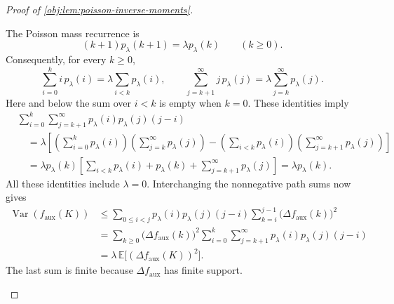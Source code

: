 \documentclass[11pt]{article}
\begin{document}
\begin{proof}[Proof of \cref{obj:lem:poisson-inverse-moments}]
\begin{enumerate}
The Poisson mass recurrence is
\[
(k+1)p_\lambda(k+1)=\lambda p_\lambda(k)
\qquad(k\ge0).
\]
Consequently, for every \(k\ge0\),
\[
\sum_{i=0}^{k}i\,p_\lambda(i)
=\lambda\sum_{i<k}p_\lambda(i),
\qquad
\sum_{j=k+1}^{\infty}j\,p_\lambda(j)
=\lambda\sum_{j=k}^{\infty}p_\lambda(j).
\]
Here and below the sum over \(i<k\) is empty when \(k=0\). These identities imply
\[
\begin{aligned}
&\sum_{i=0}^{k}\sum_{j=k+1}^{\infty}
p_\lambda(i)p_\lambda(j)(j-i)\\
&\quad=\lambda\left[
\left(\sum_{i=0}^{k}p_\lambda(i)\right)
\left(\sum_{j=k}^{\infty}p_\lambda(j)\right)
-
\left(\sum_{i<k}p_\lambda(i)\right)
\left(\sum_{j=k+1}^{\infty}p_\lambda(j)\right)
\right]\\
&\quad=\lambda p_\lambda(k)
\left[
\sum_{i<k}p_\lambda(i)+p_\lambda(k)
+\sum_{j=k+1}^{\infty}p_\lambda(j)
\right]
=\lambda p_\lambda(k).
\end{aligned}
\]
All these identities include \(\lambda=0\). Interchanging the nonnegative path sums now gives
\[
\begin{aligned}
\operatorname{Var}(f_{\mathrm{aux}}(K))
&\le
\sum_{0\le i<j}p_\lambda(i)p_\lambda(j)(j-i)
\sum_{k=i}^{j-1}\bigl(\Delta f_{\mathrm{aux}}(k)\bigr)^2\\
&=
\sum_{k\ge0}\bigl(\Delta f_{\mathrm{aux}}(k)\bigr)^2
\sum_{i=0}^{k}\sum_{j=k+1}^{\infty}
p_\lambda(i)p_\lambda(j)(j-i)\\
&=\lambda\,\mathbb E\bigl[(\Delta f_{\mathrm{aux}}(K))^2\bigr].
\end{aligned}
\]
The last sum is finite because \(\Delta f_{\mathrm{aux}}\) has finite support. %


\end{enumerate}
\end{proof}
\end{document}
